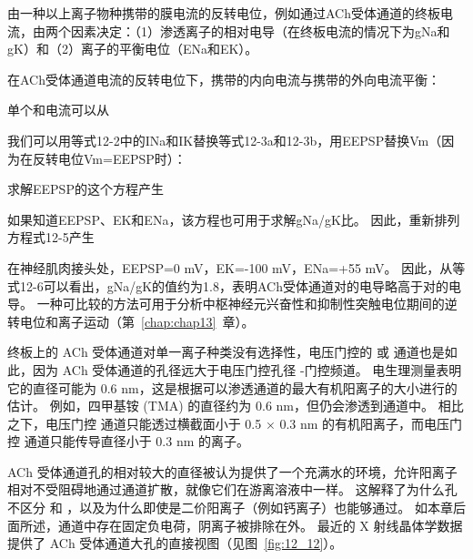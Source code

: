 \begin{proposition}[端板电位的反转电位] \label{box:12_1}
	
	\quad \quad 由一种以上离子物种携带的膜电流的反转电位，例如通过ACh受体通道的终板电流，由两个因素决定：（1）渗透离子的相对电导（在终板电流的情况下为gNa和gK）和（2）离子的平衡电位（ENa和EK）。
	
	\quad \quad 在ACh受体通道电流的反转电位下，携带的内向电流与携带的外向电流平衡：
	
	\quad \quad 单个和电流可以从
	
	\quad \quad 我们可以用等式12-2中的INa和IK替换等式12-3a和12-3b，用EEPSP替换Vm（因为在反转电位Vm=EEPSP时）：
	
	\quad \quad 求解EEPSP的这个方程产生
	
	\quad \quad 如果知道EEPSP、EK和ENa，该方程也可用于求解gNa/gK比。
	因此，重新排列方程式12-5产生
	
	\quad \quad 在神经肌肉接头处，EEPSP=0 mV，EK=-100 mV，ENa=+55 mV。
	因此，从等式12-6可以看出，gNa/gK的值约为1.8，表明ACh受体通道对的电导略高于对的电导。
	一种可比较的方法可用于分析中枢神经元兴奋性和抑制性突触电位期间的逆转电位和离子运动（第~\ref{chap:chap13}~章）。
	
\end{proposition}



终板上的 ACh 受体通道对单一离子种类没有选择性，电压门控的  或  通道也是如此，因为 ACh 受体通道的孔径远大于电压门控孔径 -门控频道。
电生理测量表明它的直径可能为 0.6 nm，这是根据可以渗透通道的最大有机阳离子的大小进行的估计。
例如，四甲基铵 (TMA) 的直径约为 0.6 nm，但仍会渗透到通道中。
相比之下，电压门控  通道只能透过横截面小于 0.5 × 0.3 nm 的有机阳离子，而电压门控  通道只能传导直径小于 0.3 nm 的离子。


ACh 受体通道孔的相对较大的直径被认为提供了一个充满水的环境，允许阳离子相对不受阻碍地通过通道扩散，就像它们在游离溶液中一样。
这解释了为什么孔不区分  和 ，以及为什么即使是二价阳离子（例如钙离子）也能够通过。
如本章后面所述，通道中存在固定负电荷，阴离子被排除在外。
最近的 X 射线晶体学数据提供了 ACh 受体通道大孔的直接视图（见图~\ref{fig:12_12}）。


